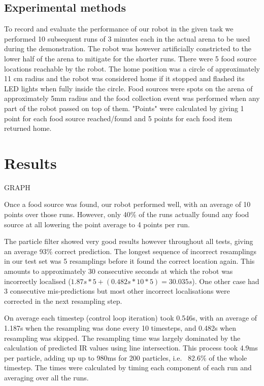 \documentclass[paper=a4, fontsize=12pt]{scrartcl}	%
\numberwithin{equation}{section}		%
\numberwithin{figure}{section}			%
\numberwithin{table}{section}				%
\begin{document}
\subsection{Experimental methods}
To record and evaluate the performance of our robot in the given task we performed 10 subsequent runs of 3 minutes each in the actual arena to be used during the demonstration. The robot was however artificially constricted to the lower half of the arena to mitigate for the shorter runs. There were 5 food source locations reachable by the robot. The home position was a circle of approximately 11 cm radius and the robot was considered home if it stopped and flashed its LED lights when fully inside the circle. Food sources were spots on the arena of approximately 5mm radius and the food collection event was performed when any part of the robot passed on top of them. "Points" were calculated by giving 1 point for each food source reached/found and 5 points for each food item returned home.

\section{Results}
GRAPH

Once a food source was found, our robot performed well, with an average of 10 points over those runs. However, only 40\% of the runs actually found any food source at all lowering the point average to 4 points per run.

The particle filter showed very good results however throughout all tests, giving an average 93\% correct prediction. The longest sequence of incorrect resamplings in our test set was 5 resamplings before it found the correct location again. This amounts to approximately 30 consecutive seconds at which the robot was incorrectly localised (\(1.87s * 5 + (0.482s * 10 * 5) = 30.035s\)). One other case had 3 consecutive mis-predictions but most other incorrect localisations were corrected in the next resampling step.

On average each timestep (control loop iteration) took 0.546s, with an average of 1.187s when the resampling was done every 10 timesteps, and 0.482s when resampling was skipped. The resampling time was largely dominated by the calculation of predicted IR values using line intersection. This process took 4.9ms per particle, adding up up to 980ms for 200 particles, i.e. ~82.6\% of the whole timestep. The times were calculated by timing each component of each run and averaging over all the runs.
\end{document}
